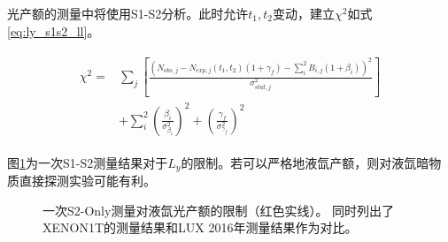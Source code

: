 光产额的测量中将使用S1-S2分析。此时允许$t_1,t_2$变动，建立$\chi^2$如式\ref{eq:ly_s1s2_ll}。

\begin{align}
    \label{eq:ly_s1s2_ll}
    \begin{split}
    \chi^2 =& \sum_j\left[\frac{\left(N_{obs,j} - N_{exp,j}(t_1,t_2)(1 + \gamma_f) 
    - \sum_{i}^2 B_{i,j}(1 + \beta_i)\right)^2}{\sigma^2_{stat,j}}\right] \\
    & + \sum_{i}^2(\frac{\beta_i}{\sigma^2_{\beta_i}})^2 + (\frac{\gamma_f}{\sigma^2_{\gamma_f}})^2
    \end{split}
\end{align}

图\ref{fig:ly_sensitivity_s1s2}为一次S1-S2测量结果对于$L_y$的限制。若可以严格地液氙产额，则对液氙暗物质直接探测实验可能有利。

\begin{figure}
  \centering
  
  \caption{\label{fig:ly_sensitivity_s1s2} 一次S2-Only测量对液氙光产额的限制（红色实线）。
  同时列出了XENON1T的测量结果\cite{aprile_search_2021}和LUX 2016年测量结果\cite{lux_collaboration_low-energy_2016}作为对比。}
\end{figure}

